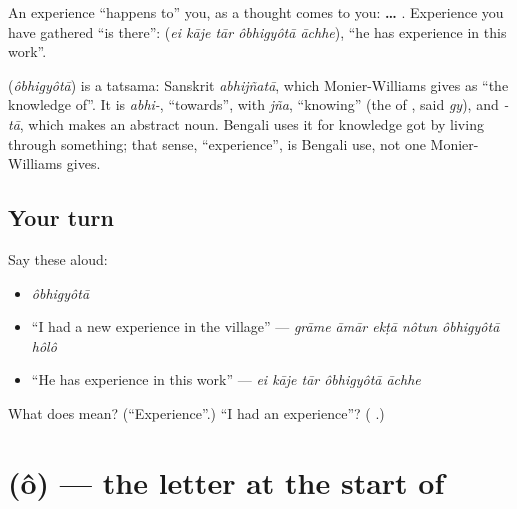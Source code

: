 An experience \textquotedblleft{}happens to\textquotedblright{} you, as a thought comes to you: \textbf{ …  }. Experience you have gathered \textquotedblleft{}is there\textquotedblright{}: \textbf{    } (\emph{ei kāje tār ôbhigyôtā āchhe}), \textquotedblleft{}he has experience in this work\textquotedblright{}.

\begin{cousinweb}
\textbf{} (\emph{ôbhigyôtā}) is a tatsama: Sanskrit \emph{abhijñatā}, which Monier-Williams gives as \textquotedblleft{}the knowledge of\textquotedblright{}. It is \emph{abhi-}, \textquotedblleft{}towards\textquotedblright{}, with \emph{jña}, \textquotedblleft{}knowing\textquotedblright{} (the \textbf{} of \textbf{}, said \emph{gy}), and \emph{-tā}, which makes an abstract noun. Bengali uses it for knowledge got by living through something; that sense, \textquotedblleft{}experience\textquotedblright{}, is Bengali use, not one Monier-Williams gives.
\end{cousinweb}

\subsection*{Your turn}
Say these aloud:

\begin{itemize}
\raggedright
  \item \emph{ôbhigyôtā}
  \item \textquotedblleft{}I had a new experience in the village\textquotedblright{} — \emph{grāme āmār ekṭā nôtun ôbhigyôtā hôlô}
  \item \textquotedblleft{}He has experience in this work\textquotedblright{} — \emph{ei kāje tār ôbhigyôtā āchhe}
\end{itemize}

\begin{tcolorbox}[breakable,colback=teal!4,colframe=teal!35!black,title={Before you move on}]
What does \textbf{} mean? (\textquotedblleft{}Experience\textquotedblright{}.) \textquotedblleft{}I had an experience\textquotedblright{}? (\textbf{   }.)
\end{tcolorbox}
\section[\texorpdfstring{\bn{অ} (ô)}{অ (ô)}]{ (ô) — the letter at the start of }

